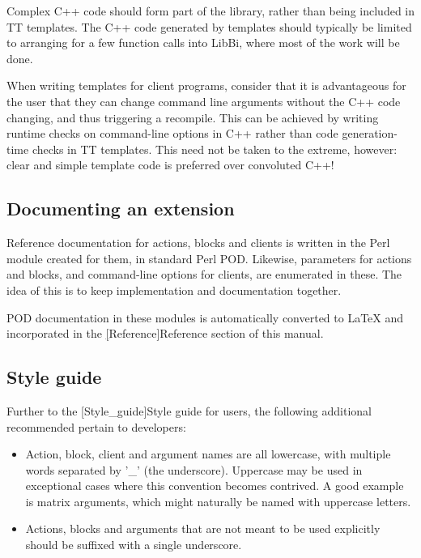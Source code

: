 Complex C++ code should form part of the library, rather than being included
in TT templates. The C++ code generated by templates should typically be
limited to arranging for a few function calls into LibBi, where most of the
work will be done.

When writing templates for client programs, consider that it is advantageous
for the user that they can change command line arguments without the C++ code
changing, and thus triggering a recompile. This can be achieved by writing
runtime checks on command-line options in C++ rather than code generation-time
checks in TT templates. This need not be taken to the extreme, however: clear
and simple template code is preferred over convoluted C++!

\subsection{Documenting an extension\label{Documenting_an_extension}}

Reference documentation for actions, blocks and clients is written in the Perl
module created for them, in standard Perl POD. Likewise, parameters for
actions and blocks, and command-line options for clients, are enumerated in
these. The idea of this is to keep implementation and documentation together.

POD documentation in these modules is automatically converted to LaTeX and
incorporated in the \hyperref[hyper][Reference]{Reference} section of this
manual.

\subsection{Style guide\label{Developer_style_guide}}

Further to the \hyperref[hyper][Style_guide]{Style guide} for users, the
following additional recommended pertain to developers:
\begin{itemize}
\item Action, block, client and argument names are all lowercase, with
  multiple words separated by '\_' (the underscore). Uppercase may be used in
  exceptional cases where this convention becomes contrived. A good example is
  matrix arguments, which might naturally be named with uppercase letters.
\item Actions, blocks and arguments that are not meant to be used explicitly
  should be suffixed with a single underscore.
\end{itemize}

